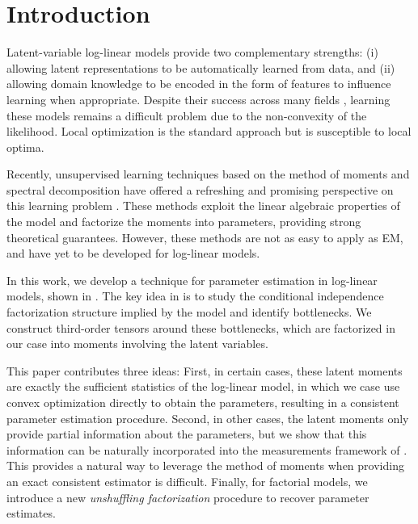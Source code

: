 \section{Introduction} \label{sec:introduction}

Latent-variable log-linear models provide two complementary strengths: (i) allowing
latent representations to be automatically learned from data, and (ii)
allowing domain knowledge to be encoded in the form of features
to influence learning when appropriate.
Despite their success across many fields \cite{quattoni04crf,haghighi06prototype,liang06discrimative,kirkpatrick10painless,XXX},
learning these models remains a difficult problem due to the non-convexity of the likelihood.
Local optimization is the standard approach but is susceptible to local optima.

Recently, unsupervised learning techniques based on the method of moments and
spectral decomposition have offered a refreshing and promising perspective on
this learning problem \citep{hsu09spectral,anandkumar11tree,anandkumar12moments,anandkumar12lda,hsu12identifiability,balle11transducer,balle12automata}.
These methods exploit the linear algebraic properties of the model and
factorize the moments into parameters, providing strong theoretical guarantees.
However, these methods are not as easy to apply as EM, and have yet to be
developed for log-linear models.

In this work, we develop a technique for parameter estimation in log-linear
models, shown in .  The key idea in
\citet{anandkumar12moments,anandkumar13tensor} is to study the conditional
independence factorization structure implied by the model and identify
bottlenecks.  We construct third-order tensors around these bottlenecks, which
are factorized in our case into moments involving the latent variables.


This paper contributes three ideas:
First, in certain cases, these latent moments are exactly the sufficient statistics of
the log-linear model, in which we case use convex optimization directly to obtain the parameters,
resulting in a consistent parameter estimation procedure.
Second, in other cases, the latent moments only provide partial information about the parameters,
but we show that this information can be naturally incorporated into the measurements framework of \citet{liang09measurements}.
This provides a natural way to leverage the method of moments when providing an
exact consistent estimator is difficult.
Finally, for factorial models, we introduce a new \emph{unshuffling
factorization} procedure to recover parameter estimates.
